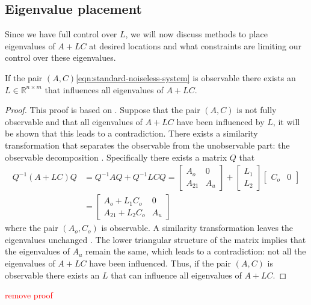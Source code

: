 \subsection{Eigenvalue placement}
Since we have full control over $L$, we will now discuss methods to place eigenvalues of $A+LC$ at desired locations and what constraints are limiting our control over these eigenvalues.

\begin{theorem}
\label{th:arbitrary-alc-eigenvalues}
    If the pair $(A,C)$\eqref{eqn:standard-noiseless-system} is observable there exists an $L \in \mathbb{R}^{n \times m}$ that influences all eigenvalues of $A+LC$.
\end{theorem}
\begin{proof}
    This proof is based on \cite[Section 4.2]{Antsaklis2006LinearSystems}. Suppose that the pair $(A,C)$ is not fully observable and that all eigenvalues of $A+LC$  have been influenced by $L$, it will be shown that this leads to a contradiction. There exists a similarity transformation that separates the observable from the unobservable part: the observable decomposition \cite[Section 16.1]{Hespanha2018LinearTheory}. Specifically there exists a matrix $Q$ that
    \begin{equation}
    \begin{split}
        Q^{-1}(A+LC)Q 
        &= Q^{-1}AQ + Q^{-1}LCQ =
        \begin{bmatrix}
            A_o & 0 \\
            A_{21} & A_u
        \end{bmatrix}
        + 
        \begin{bmatrix}
            L_1 \\
            L_2
        \end{bmatrix}
        \begin{bmatrix}
            C_o & 0
        \end{bmatrix} \\
        &=
        \begin{bmatrix}
            A_o + L_1 C_o & 0 \\
            A_{21} + L_2 C_o & A_u
        \end{bmatrix}
    \end{split}
    \end{equation}  
where the pair $(A_o,C_o)$ is observable. A similarity transformation leaves the eigenvalues unchanged \cite[Section 5.2]{Lay2016LinearApplications}. The lower triangular structure of the matrix implies that the eigenvalues of $A_u$ remain the same, which leads to a contradiction: not all the eigenvalues of $A+LC$ have been influenced. Thus, if the pair $(A,C)$ is observable there exists an $L$ that can influence all eigenvalues of $A+LC$.
\end{proof}
\textcolor{red}{remove proof}

